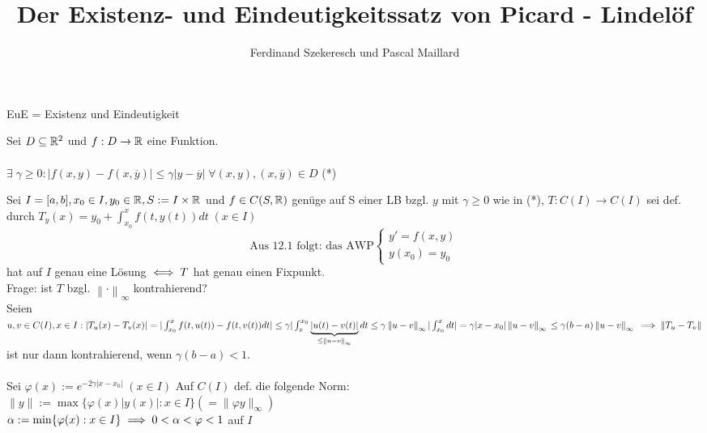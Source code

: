\documentclass{article}
\title{Der Existenz- und Eindeutigkeitssatz von Picard - Lindelöf}
\author{Ferdinand Szekeresch und Pascal Maillard}
\begin{document}
\maketitle

EuE = Existenz und Eindeutigkeit

\begin{definition}
Sei $D \subseteq \mathbb{R}^2$ und $f: D \rightarrow \mathbb{R}$ eine Funktion. \\
 \equizu \\
$\exists \; \gamma \geq 0 : |f(x,y) - f(x,\overline{y})| \leq \gamma |y - \overline{y}| \; \forall (x,y), (x,\overline{y}) \in D$ \; (*)
\end{definition}

\begin{vorbetrachtungen}
Sei $I = [a,b] , x_0 \in I, y_0 \in \mathbb{R}, S := I \times \mathbb{R}$ und $f \in C(S,\mathbb{R})$ genüge auf S einer LB bzgl. $y$ mit $\gamma \geq 0$ wie in (*), $T : C(I) \rightarrow C(I)$ sei def. durch $T_y(x) = y_0 + \int_{x_0}^{x}f(t,y(t)) dt \; (x \in I)$ \\
$$ \text{Aus 12.1 folgt: das AWP} \begin{cases} y' = f(x,y) \\ y(x_0) = y_0 \end{cases}$$
hat auf $I$ genau eine Lösung $\iff T$ hat genau einen Fixpunkt. \\
Frage: ist $T$ bzgl. $\left\| \cdot \right\|_{\infty}$ kontrahierend? \\
Seien $u, v \in C(I), x \in I: |T_u(x) - T_v(x)| = |\int_{x_0}^{x}f(t,u(t)) - f(t,v(t)) dt| \\ \leq \gamma |\int_{x}^{x_0} \underbrace{|u(t) - v(t)|}_{\leq \left\|u - v\right\|_{\infty}} dt \leq \gamma \left\|u -v\right\|_\infty |\int_{x_0}^{x} dt| = \gamma|x - x_0| \left\|u - v\right\|_\infty \\ \leq \gamma (b - a)\left\|u - v\right\|_{\infty} \\ \implies \left\|T_u - T_v\right\|$ ist nur dann kontrahierend, wenn $\gamma(b - a) < 1.$ \\\\
Sei $\varphi(x) := e^{-2\gamma|x - x_0|} \; (x \in I)$ Auf $C(I)$ def. die folgende Norm: \\ 
$\|y\| := \max \{\varphi(x) |y(x)| : x \in I\} (= \|\varphi y\|_{\infty})$ \\
$\alpha := \min \{\varphi(x) : x \in I\} \implies 0 < \alpha < \varphi < 1$ auf $I$ \\

\end{vorbetrachtungen}
\end{document}
